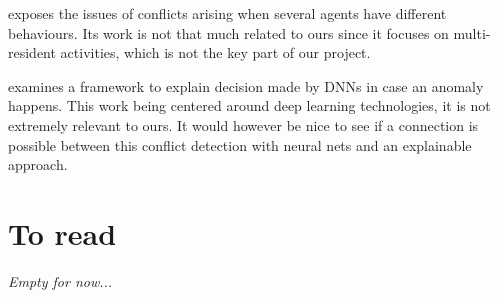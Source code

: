 \documentclass{article}
\begin{document}
    \cite{mohamed2017conflict} exposes the issues of conflicts arising when several agents have different behaviours. Its work is not that much related to ours since it focuses on multi-resident activities, which is not the key part of our project.

    \cite{amarasinghe2018toward} examines a framework to explain decision made by DNNs in case an anomaly happens. This work being centered around deep learning technologies, it is not extremely relevant to ours. It would however be nice to see if a connection is possible between this conflict detection with neural nets and an explainable approach.
    
    \section{To read}
        \emph{Empty for now...}
\newpage


\end{document}
